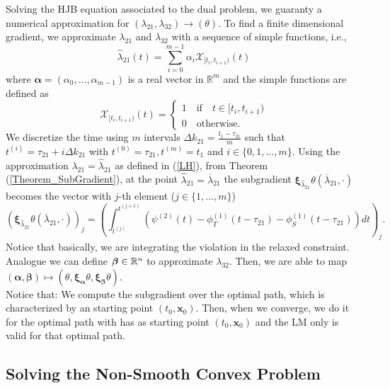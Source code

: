 Solving the HJB equation associated to the dual problem, we guaranty a numerical approximation for $(\lambda_{21},\lambda_{32})\to(\theta)$. To find a finite dimensional gradient, we approximate $\lambda_{21}$ and $\lambda_{32}$ with a sequence of simple functions, i.e.,
\begin{equation}
\hat{\lambda}_{21}(t)=\sum_{i=0}^{m-1}\alpha_i\mathcal{X}_{[t_i,t_{i+1})}(t)
\label{LH}
\end{equation}
where $\bm{\alpha}=(\alpha_0,\dots,\alpha_{m-1})$ is a real vector in $\mathbb{R}^m$ and the simple functions are defined as
\begin{equation}
\mathcal{X}_{[t_i,t_{i+1})}(t)=\begin{cases}
1\quad\text{if}\quad t\in[t_i,t_{i+1})\\
0\quad\text{otherwise}.
\end{cases}
\end{equation}
We discretize the time using $m$ intervals $\Delta k_{21}=\frac{t_1-\tau_{21}}{m}$ such that $t^{(i)}=\tau_{21}+i\Delta k_{21}$ with $t^{(0)}=\tau_{21},t^{(m)}=t_1$ and $i\in\{0,1,\dots,m\}$. Using the approximation $\lambda_{21}=\hat{\lambda}_{21}$ as defined in (\ref{LH}), from Theorem (\ref{Theorem_SubGradient}), at the point $\hat{\lambda}_{21}=\overline{\lambda}_{21}$ the subgradient $\bm{\xi}_{\hat{\lambda}_{21}}\theta(\overline{\lambda}_{21},\cdot)$ becomes the vector with $j$-th element ($j\in\{1,\dots,m\}$)
\begin{equation}
\left(\bm{\xi}_{\hat{\lambda}_{21}}\theta(\overline{\lambda}_{21},\cdot)\right)_j=\left(\int_{t^{(j)}}^{t^{(j+1)}}\left(\psi^{(2)}(t)-\phi_T^{(1)}(t-\tau_{21})-\phi_S^{(1)}(t-\tau_{21})\right)dt\right)_j.
\label{GradVec}
\end{equation}
Notice that basically, we are integrating the violation in the relaxed constraint.\\
Analogue we can define $\bm{\beta}\in\mathbb{R}^n$ to approximate $\lambda_{32}$. Then, we are able to map $(\bm{\alpha},\bm{\beta})\mapsto(\theta,\bm{\xi}_{\bm{\alpha}}\theta,\bm{\xi}_{\bm{\beta}}\theta)$.\\
Notice that: We compute the subgradient over the optimal path, which is characterized by an starting point $(t_0,\bm{x}_0)$. Then, when we converge, we do it for the optimal path with has as starting point $(t_0,\bm{x}_0)$ and the LM only is valid for that optimal path.

\subsection{Solving the Non-Smooth Convex Problem}

